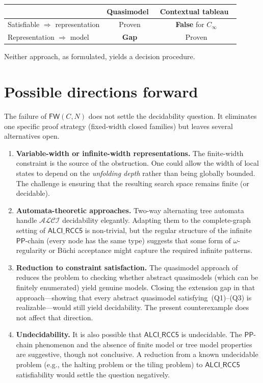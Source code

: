 \documentclass[11pt]{article}
\theoremstyle{definition}
\newcommand{\ALCIRCC}{\mathsf{ALCI\_RCC5}}
\newcommand{\Pp}{\mathsf{PP}}
\begin{document}
\begin{center}
\begin{tabular}{lcc}
\toprule
& Quasimodel~\cite{Claude2026} & Contextual tableau~\cite{GPT2026} \\
\midrule
Satisfiable $\Rightarrow$ representation & Proven & \textbf{False} for $C_\infty$ \\
Representation $\Rightarrow$ model & \textbf{Gap} & Proven \\
\bottomrule
\end{tabular}
\end{center}

Neither approach, as formulated, yields a decision procedure.

\section{Possible directions forward}\label{sec:directions}

The failure of $\mathsf{FW}(C,N)$ does not settle the decidability
question.  It eliminates one specific proof strategy (fixed-width
closed families) but leaves several alternatives open.

\begin{enumerate}
\item \textbf{Variable-width or infinite-width representations.}\;
    The finite-width constraint is the source of the obstruction.
    One could allow the width of local states to depend on the
    \emph{unfolding depth} rather than being globally bounded.  The
    challenge is ensuring that the resulting search space remains
    finite (or decidable).

\item \textbf{Automata-theoretic approaches.}\;
    Two-way alternating tree automata handle $\mathcal{ALCI}$
    decidability elegantly.  Adapting them to the complete-graph
    setting of $\ALCIRCC$ is non-trivial, but the regular structure
    of the infinite $\Pp$-chain (every node has the same type)
    suggests that some form of $\omega$-regularity or
    B\"uchi acceptance might capture the required infinite patterns.

\item \textbf{Reduction to constraint satisfaction.}\;
    The quasimodel approach of~\cite{Claude2026} reduces the problem
    to checking whether abstract quasimodels (which can be finitely
    enumerated) yield genuine models.  Closing the extension gap in
    that approach---showing that every abstract quasimodel
    satisfying~(Q1)--(Q3) is realizable---would still yield decidability.
    The present counterexample does not affect that direction.

\item \textbf{Undecidability.}\;
    It is also possible that $\ALCIRCC$ is undecidable.  The
    $\Pp$-chain phenomenon and the absence of finite model or tree
    model properties are suggestive, though not conclusive.  A
    reduction from a known undecidable problem (e.g., the halting
    problem or the tiling problem) to $\ALCIRCC$ satisfiability would
    settle the question negatively.
\end{enumerate}
\end{document}
